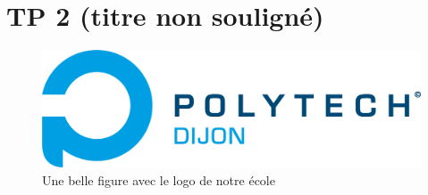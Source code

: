 

\section{TP 2 (titre non souligné)}

\begin{figure}[H]
    \centering
    \includegraphics[width=14cm]{Graphismes-Polytech-Dijon/logos/logo-couleur.png}
    \caption{Une belle figure avec le logo de notre école}
\end{figure}